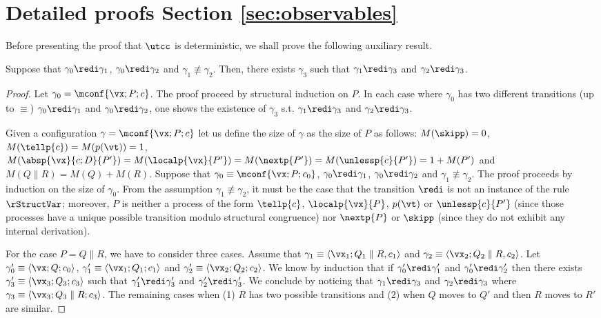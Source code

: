 \documentclass{tlp}
\begin{document}
\section{Detailed proofs Section \ref{sec:observables}} \label{app:sos}
Before presenting the proof that $\utcc$ is deterministic, we shall prove the following auxiliary result. 
\begin{lemma}[Confluence]\label{lemma:confluence}
Suppose that $\gamma_0 \redi \gamma_1$,
$\gamma_0 \redi \gamma_2$ and $\gamma_1 \not\equiv \gamma_2$.  Then, there exists 
$\gamma_3$ such that $\gamma_1 \redi \gamma_3$ and $\gamma_2 \redi \gamma_3$. 
\end{lemma}
\begin{proof} 
Let $\gamma_0 = \mconf{\vx; P;c}$. The proof proceed by structural induction on $P$.  In each case where $\gamma_0$ has two different transitions  (up to $\equiv$)  $\gamma_0 \redi \gamma_1$ and $\gamma_0 \redi \gamma_2$, one shows the existence of $\gamma_3$ s.t. $\gamma_1 \redi \gamma_3$ and $\gamma_2 \redi \gamma_3$. 

 Given a configuration $\gamma=\mconf{\vx; P;c}$
 let us define the size of $\gamma$ as the size of  $P$  as follows:
$M(\skipp)=0$, $M(\tellp{c})=M(p(\vt))=1$, $M(\absp{\vx}{c;D}{P'})=M(\localp{\vx}{P'}) = M(\nextp{P'})= M(\unlessp{c}{P'}) = 1 + M(P')$ and $M(Q\parallel R) =M(Q) + M(R)$.
 Suppose  that $\gamma_0\equiv \mconf{\vx; P; c_0 }$, $\gamma_0  \redi \gamma_1$, $\gamma_0 \redi \gamma_2$ and $\gamma_1 \not\equiv \gamma_2$. 
 The proof proceeds by induction on the size of $\gamma_0$. 
 From the assumption $\gamma_1 \not\equiv \gamma_2$, it must be the case that the transition $\redi$ is not an instance of the rule $\rStructVar$; moreover, 
   $P$ is neither  a process of the form $\tellp{c}$, $\localp{\vx}{P}$, $p(\vt)$
 or  $\unlessp{c}{P'}$ (since those processes have a unique possible transition modulo structural congruence) nor $\nextp{P}$ or $\skipp$ (since they do not exhibit any internal derivation). 

 For the case $P= Q \parallel R$, we have to consider three cases.
 Assume that  $\gamma_1 \equiv \langle\vx_1; Q_1 \parallel R, c_1\rangle$
 and $\gamma_2 \equiv \langle \vx_2; Q_2 \parallel R, c_2\rangle$.
 Let $\gamma'_0 \equiv \langle \vx; Q;c_0\rangle$, 
$\gamma'_1 \equiv \langle\vx_1; Q_1;c_1\rangle$ and
$\gamma'_2 \equiv \langle\vx_2; Q_2;c_2\rangle$. 
We know by induction that if $\gamma'_0 \redi 
\gamma'_1$ and 
 $\gamma_0' \redi \gamma'_2$ then there exists
 $\gamma_3'  \equiv \langle \vx_3;Q_3; c_3\rangle$
 such that $\gamma_1' \redi \gamma_3'$ and $\gamma_2' \redi \gamma_3'$.
We conclude by noticing that  $\gamma_1 \redi \gamma_3 $ and $\gamma_2 \redi \gamma_3$ where $\gamma_3 \equiv \langle \vx_3;Q_3 \parallel R; c_3\rangle$. The  remaining cases when  (1) $R$ has two possible transitions and (2) when $Q$ moves to $Q'$ and then $R$ moves to $R'$ are similar. 



\end{proof}
\end{document}
